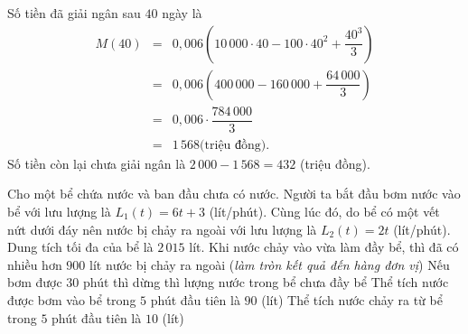 \begin{ex}
{\begin{itemchoice}
			\itemch Số tiền đã giải ngân sau $40$ ngày là
			\begin{eqnarray*}
				M(40) 	&=& 0{,}006\left(10\,000 \cdot 40 - 100 \cdot 40^2 + \dfrac{40^3}{3}\right)\\
				&=& 0{,}006\left(400\,000 - 160\,000 + \dfrac{64\,000}{3}\right) \\
				&=& 0{,}006 \cdot \dfrac{784\,000}{3} \\
				&=& 1\,568 \text{(triệu đồng).}
			\end{eqnarray*}
			Số tiền còn lại chưa giải ngân là $2\,000 - 1\,568 = 432$ (triệu đồng).
		\end{itemchoice}
	}
\end{ex}

\begin{ex}%
	Cho một bể chứa nước và ban đầu chưa có nước. Người ta bắt đầu bơm nước vào bể với lưu lượng là $L_1(t) = 6t+3$ (lít/phút). Cùng lúc đó, do bể có một vết nứt dưới đáy nên nước bị chảy ra ngoài với lưu lượng là $L_2(t) = 2t$ (lít/phút). Dung tích tối đa của bể là $2\,015$ lít.
	\choiceTF
	{\True Khi nước chảy vào vừa làm đầy bể, thì đã có nhiều hơn $900$ lít nước bị chảy ra ngoài (\textit{làm tròn kết quả đến hàng đơn vị})}
	{\True Nếu bơm được $30$ phút thì dừng thì lượng nước trong bể chưa đầy bể}
	{\True Thể tích nước được bơm vào bể trong $5$ phút đầu tiên là $90$ (lít)}
	{Thể tích nước chảy ra từ bể trong $5$ phút đầu tiên là $10$ (lít)}
\end{ex}

